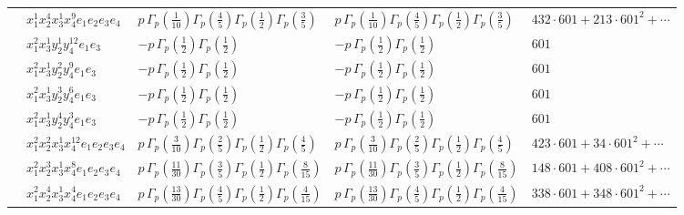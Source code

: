 \documentclass[11pt]{article}
\begin{document}
\begin{table}[ht]
{\begin{tabular}{@{}lllll@{}}
 & $x_{1}^{1} x_{2}^{4} x_{3}^{1} x_{4}^{9}  e_{1} e_{2} e_{3} e_{4}$ & $p \, \Gamma_p \left( \frac{1}{10} \right) \Gamma_p \left( \frac{4}{5} \right) \Gamma_p \left( \frac{1}{2} \right) \Gamma_p \left( \frac{3}{5} \right)$ & $p \, \Gamma_p \left( \frac{1}{10} \right) \Gamma_p \left( \frac{4}{5} \right) \Gamma_p \left( \frac{1}{2} \right) \Gamma_p \left( \frac{3}{5} \right)$ & $432{\cdot}601{+}213{\cdot}601^{2}{+}\cdots$ \\
 & $x_{1}^{2} x_{3}^{1} y_{2}^{1} y_{4}^{12} e_{1} e_{3}$ & $- p \, \Gamma_p \left( \frac{1}{2} \right) \Gamma_p \left( \frac{1}{2} \right)$ & $- p \, \Gamma_p \left( \frac{1}{2} \right) \Gamma_p \left( \frac{1}{2} \right)$ & $601$ \\
 & $x_{1}^{2} x_{3}^{1} y_{2}^{2} y_{4}^{9} e_{1} e_{3}$ & $- p \, \Gamma_p \left( \frac{1}{2} \right) \Gamma_p \left( \frac{1}{2} \right)$ & $- p \, \Gamma_p \left( \frac{1}{2} \right) \Gamma_p \left( \frac{1}{2} \right)$ & $601$ \\
 & $x_{1}^{2} x_{3}^{1} y_{2}^{3} y_{4}^{6} e_{1} e_{3}$ & $- p \, \Gamma_p \left( \frac{1}{2} \right) \Gamma_p \left( \frac{1}{2} \right)$ & $- p \, \Gamma_p \left( \frac{1}{2} \right) \Gamma_p \left( \frac{1}{2} \right)$ & $601$ \\
 & $x_{1}^{2} x_{3}^{1} y_{2}^{4} y_{4}^{3} e_{1} e_{3}$ & $- p \, \Gamma_p \left( \frac{1}{2} \right) \Gamma_p \left( \frac{1}{2} \right)$ & $- p \, \Gamma_p \left( \frac{1}{2} \right) \Gamma_p \left( \frac{1}{2} \right)$ & $601$ \\
 & $x_{1}^{2} x_{2}^{2} x_{3}^{1} x_{4}^{12}  e_{1} e_{2} e_{3} e_{4}$ & $p \, \Gamma_p \left( \frac{3}{10} \right) \Gamma_p \left( \frac{2}{5} \right) \Gamma_p \left( \frac{1}{2} \right) \Gamma_p \left( \frac{4}{5} \right)$ & $p \, \Gamma_p \left( \frac{3}{10} \right) \Gamma_p \left( \frac{2}{5} \right) \Gamma_p \left( \frac{1}{2} \right) \Gamma_p \left( \frac{4}{5} \right)$ & $423{\cdot}601{+}34{\cdot}601^{2}{+}\cdots$ \\
 & $x_{1}^{2} x_{2}^{3} x_{3}^{1} x_{4}^{8}  e_{1} e_{2} e_{3} e_{4}$ & $p \, \Gamma_p \left( \frac{11}{30} \right) \Gamma_p \left( \frac{3}{5} \right) \Gamma_p \left( \frac{1}{2} \right) \Gamma_p \left( \frac{8}{15} \right)$ & $p \, \Gamma_p \left( \frac{11}{30} \right) \Gamma_p \left( \frac{3}{5} \right) \Gamma_p \left( \frac{1}{2} \right) \Gamma_p \left( \frac{8}{15} \right)$ & $148{\cdot}601{+}408{\cdot}601^{2}{+}\cdots$ \\
 & $x_{1}^{2} x_{2}^{4} x_{3}^{1} x_{4}^{4}  e_{1} e_{2} e_{3} e_{4}$ & $p \, \Gamma_p \left( \frac{13}{30} \right) \Gamma_p \left( \frac{4}{5} \right) \Gamma_p \left( \frac{1}{2} \right) \Gamma_p \left( \frac{4}{15} \right)$ & $p \, \Gamma_p \left( \frac{13}{30} \right) \Gamma_p \left( \frac{4}{5} \right) \Gamma_p \left( \frac{1}{2} \right) \Gamma_p \left( \frac{4}{15} \right)$ & $338{\cdot}601{+}348{\cdot}601^{2}{+}\cdots$ \\

\end{tabular}}
\end{table}
\end{document}
